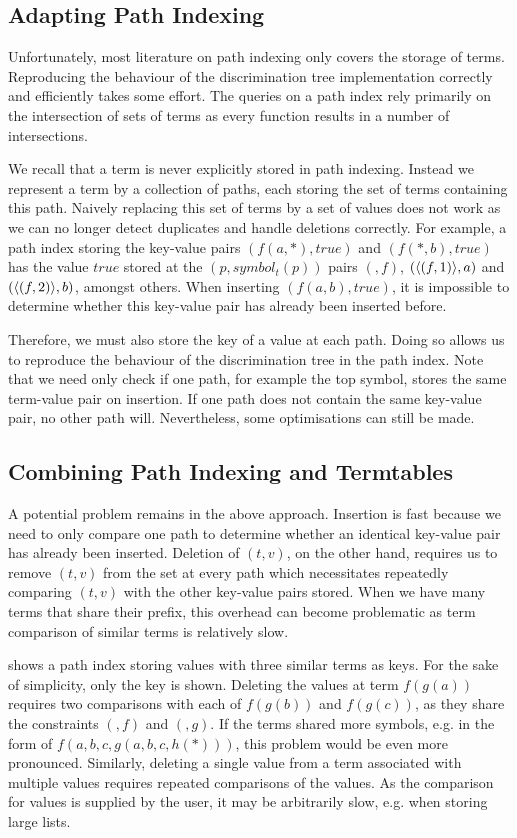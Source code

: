 \subsection{Adapting Path Indexing}
Unfortunately, most literature \cite{stickel_path-indexing_1989,mccune_experiments_1992, carbonell_set-based_1995} on path indexing only covers the storage of terms. Reproducing the behaviour of the discrimination tree implementation correctly and efficiently takes some effort. The queries on a path index rely primarily on the intersection of sets of terms as every function results in a number of intersections.

We recall that a term is never explicitly stored in path indexing. Instead we represent a term by a collection of paths, each storing the set of terms containing this path. Naively replacing this set of terms by a set of values does not work as we can no longer detect duplicates and handle deletions correctly.
For example, a path index storing the key-value pairs $(f(a,*), true)$ and $(f(*,b), true)$ has the value $true$ stored at the $(p, symbol_{t}(p))$ pairs $(\ang{}, f)$, $(\langle (f,1) \rangle, a)$ and $(\langle (f,2) \rangle, b)$, amongst others. When inserting $(f(a,b), true)$, it is impossible to determine whether this key-value pair has already been inserted before.

Therefore, we must also store the key of a value at each path. Doing so allows us to reproduce the behaviour of the discrimination tree in the path index. Note that we need only check if one path, for example the top symbol, stores the same term-value pair on insertion. If one path does not contain the same key-value pair, no other path will. Nevertheless, some optimisations can still be made.

\subsection{Combining Path Indexing and Termtables} \label{ptt}
A potential problem remains in the above approach. Insertion is fast because we need to only compare one path to determine whether an identical key-value pair has already been inserted. Deletion of $(t,v)$, on the other hand, requires us to remove $(t,v)$ from the set at every path which necessitates repeatedly comparing $(t,v)$ with the other key-value pairs stored. When we have many terms that share their prefix, this overhead can become problematic as term comparison of similar terms is relatively slow.

 shows a path index storing values with three similar terms as keys. For the sake of simplicity, only the key is shown. Deleting the values at term $f(g(a))$ requires two comparisons with each of $f(g(b))$ and $f(g(c))$, as they share the constraints $(\ang{}, f)$ and $(\ang{}, g)$. If the terms shared more symbols, e.g. in the form of $f(a,b,c,g(a,b,c,h(*)))$, this problem would be even more pronounced. Similarly, deleting a single value from a term associated with multiple values requires repeated comparisons of the values. As the comparison for values is supplied by the user, it may be arbitrarily slow, e.g. when storing large lists.

